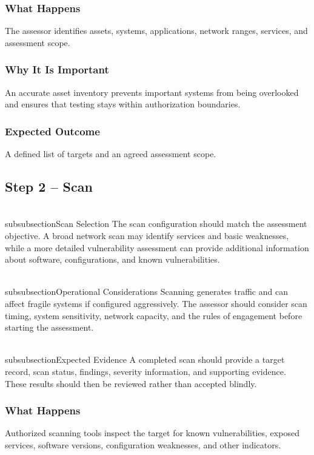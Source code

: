 \documentclass[11pt,a4paper]{article}
\begin{document}
\subsubsection{What Happens}
The assessor identifies assets, systems, applications, network ranges, services, and assessment scope.

\subsubsection{Why It Is Important}
An accurate asset inventory prevents important systems from being overlooked and ensures that testing stays within authorization boundaries.

\subsubsection{Expected Outcome}
A defined list of targets and an agreed assessment scope.


\subsection{Step 2 – Scan}
\\subsubsection{Scan Selection}
The scan configuration should match the assessment objective. A broad network scan may identify services and basic weaknesses, while a more detailed vulnerability assessment can provide additional information about software, configurations, and known vulnerabilities.

\\subsubsection{Operational Considerations}
Scanning generates traffic and can affect fragile systems if configured aggressively. The assessor should consider scan timing, system sensitivity, network capacity, and the rules of engagement before starting the assessment.

\\subsubsection{Expected Evidence}
A completed scan should provide a target record, scan status, findings, severity information, and supporting evidence. These results should then be reviewed rather than accepted blindly.

\subsubsection{What Happens}
Authorized scanning tools inspect the target for known vulnerabilities, exposed services, software versions, configuration weaknesses, and other indicators.
\end{document}
